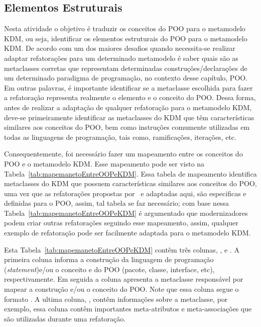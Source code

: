 \subsection{Elementos Estruturais}\label{sec:mapeamento_POO_e_KDM}
Nesta atividade o objetivo é traduzir os conceitos do POO para o metamodelo KDM, ou seja, identificar os elementos estruturais do POO para o metamodelo KDM. De acordo com  um dos maiores desafios quando necessita-se realizar adaptar refatorações para um determinado metamodelo é saber quais são as metaclasses corretas que representam determinadas construções/declarações de um determinado paradigma de programação, no contexto desse capítulo, POO. Em outras palavras, é importante identificar se a metaclasse escolhida para fazer a refatoração representa realmente o elemento e o conceito do POO. Dessa forma, antes de realizar a adaptação de qualquer refatoração para o metamodelo KDM, deve-se primeiramente identificar as metaclasses do KDM que têm características similares aos conceitos do POO, bem como instruções comumente utilizadas em todas as linguagens de programação, tais como, ramificações, iterações, etc. 

Consequentemente, foi necessário fazer um mapeamento entre os conceitos do POO e o metamodelo KDM. Esse mapeamento pode ser visto na Tabela~\ref{tab:mapemanetoEntreOOPeKDM}. Essa tabela de mapeamento identifica metaclasses do KDM que possuem características similares aos conceitos do POO, uma vez que as refatorações propostas por~ e adaptadas aqui, são especificas e definidas para o POO, assim, tal tabela se faz necessário; com base nessa Tabela~\ref{tab:mapemanetoEntreOOPeKDM} é argumentado que modernizadores podem criar outras refatorações seguindo esse mapeamento, assim, qualquer exemplo de refatoração pode ser facilmente adaptada para o metamodelo KDM. 

Esta Tabela~\ref{tab:mapemanetoEntreOOPeKDM} contêm três colunas, ,  e . A primeira coluna informa a construção da linguagem de programação (\textit{statement})e/ou o conceito e do POO (pacote, classe, interface, etc), respectivamente. Em seguida a coluna  apresenta a metaclasse responsável por mapear a construção e/ou o conceito do POO. Note que essa coluna segue o formato . A ultima coluna, , contêm informações sobre a metaclasse, por exemplo, essa coluna contêm importantes meta-atributos e meta-associações que são utilizadas durante uma refatoração.


